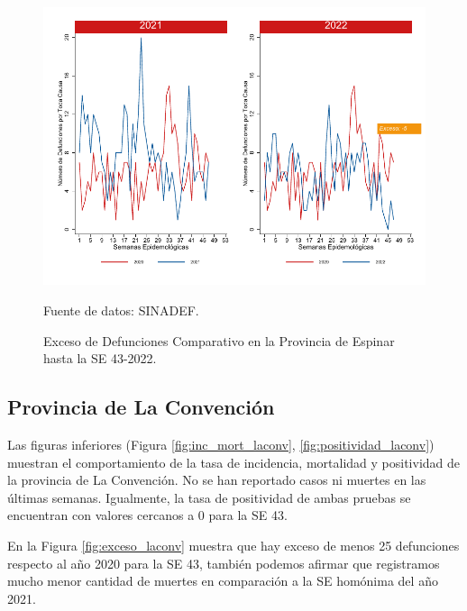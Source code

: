 \documentclass[12pt,a4paper,openany]{book}
\begin{document}
	\begin{figure}[h]
		\caption{Exceso de Defunciones Comparativo en la Provincia de Espinar hasta la SE 43-2022.}\label{fig:exceso_espinar}
		\begin{center}
			\includegraphics[width=0.7\linewidth]{../figuras/exceso_8.pdf}
		\end{center}
		{\footnotesize {Fuente de datos: SINADEF.}}
	\end{figure}
	
	\clearpage
	
	\subsection*{Provincia de La Convención}
	\noindent Las figuras inferiores (Figura \ref{fig:inc_mort_laconv}, \ref{fig:positividad_laconv}) muestran el comportamiento de la tasa de incidencia, mortalidad y positividad de la provincia de La Convención. No se han reportado casos ni muertes en las últimas semanas. Igualmente, la tasa de positividad de ambas pruebas se encuentran con valores cercanos a 0 para la SE 43. 
		
	En la Figura \ref{fig:exceso_laconv} muestra que hay exceso de menos 25 defunciones respecto al año 2020 para la SE 43, también podemos afirmar que registramos mucho menor cantidad de muertes en comparación a la SE homónima del año 2021.    
	
\end{document}
